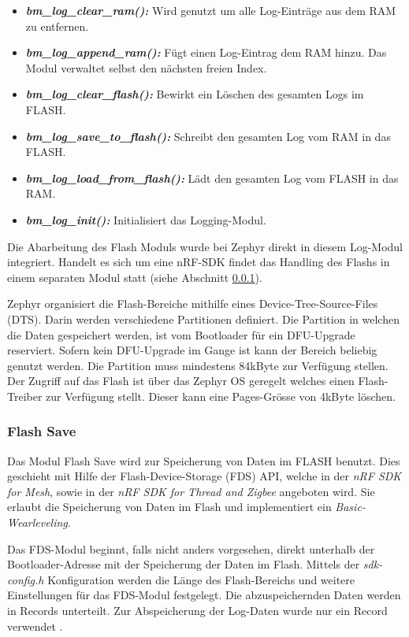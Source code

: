 \begin{itemize}
	\item \textit{\textbf{bm\_log\_clear\_ram():}} Wird genutzt um alle Log-Einträge aus dem RAM zu entfernen.
	\item \textit{\textbf{bm\_log\_append\_ram():}} Fügt einen Log-Eintrag dem RAM hinzu. Das Modul verwaltet selbst den nächsten freien Index. 
	\item \textit{\textbf{bm\_log\_clear\_flash():}} Bewirkt ein Löschen des gesamten Logs im FLASH. 
	\item \textit{\textbf{bm\_log\_save\_to\_flash():}} Schreibt den gesamten Log vom RAM in das FLASH. 
	\item \textit{\textbf{bm\_log\_load\_from\_flash():}} Lädt den gesamten Log vom FLASH in das RAM. 
	\item \textit{\textbf{bm\_log\_init():}} Initialisiert das Logging-Modul.
\end{itemize} 

Die Abarbeitung des Flash Moduls wurde bei Zephyr direkt in diesem Log-Modul integriert.
Handelt es sich um eine nRF-SDK findet das Handling des Flashs in einem separaten Modul statt (siehe Abschnitt \ref{subsubsec:FlashSave}).

Zephyr organisiert die Flash-Bereiche mithilfe eines Device-Tree-Source-Files (DTS).
Darin werden verschiedene Partitionen definiert.
Die Partition in welchen die Daten gespeichert werden, ist vom Bootloader für ein DFU-Upgrade reserviert.
Sofern kein DFU-Upgrade im Gange ist kann der Bereich beliebig genutzt werden. Die Partition muss mindestens 84kByte zur Verfügung stellen.
Der Zugriff auf das Flash ist über das Zephyr OS geregelt welches einen Flash-Treiber zur Verfügung stellt.
Dieser kann eine Pages-Grösse von 4kByte löschen. 


\subsubsection{Flash Save}\label{subsubsec:FlashSave}
Das Modul Flash Save wird zur Speicherung von Daten im FLASH benutzt.
Dies geschieht mit Hilfe der Flash-Device-Storage (FDS) API, welche in der \textit{nRF SDK for Mesh}, sowie in der \textit{nRF SDK for Thread and Zigbee} angeboten wird.
Sie erlaubt die Speicherung von Daten im Flash und implementiert ein \textit{Basic-Wearleveling}.

Das FDS-Modul beginnt, falls nicht anders vorgesehen, direkt unterhalb der Bootloader-Adresse mit der Speicherung der Daten im Flash.
Mittels der \textit{sdk-config.h} Konfiguration werden die Länge des Flash-Bereichs und weitere Einstellungen für das FDS-Modul festgelegt.
Die abzuspeichernden Daten werden in Records unterteilt.
Zur Abspeicherung der Log-Daten wurde nur ein Record verwendet \cite{nordic_semi_nrf5_sdk_flash_data_storage_2020}.



